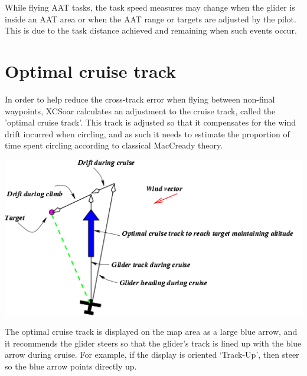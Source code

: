 \documentclass[a4paper,12pt]{refrep}
\begin{document}
While flying AAT tasks, the task speed measures may change when the
glider is inside an AAT area or when the AAT range or targets are
adjusted by the pilot.  This is due to the task distance achieved and
remaining when such events occur.


\section{Optimal cruise track}

In order to help reduce the cross-track error when flying between
non-final waypoints, XCSoar calculates an adjustment to the cruise
track, called the 'optimal cruise track'.  This track is adjusted so
that it compensates for the wind drift incurred when circling, and as
such it needs to estimate the proportion of time spent circling
according to classical MacCready theory.

\begin{center}
\begin{maxipage}
\includegraphics[angle=0,width=\linewidth,keepaspectratio='true']{figures/fig-optcruise.png}
\end{maxipage}
\end{center}

The optimal cruise track is displayed on the map area as a large blue
arrow, and it recommends the glider steers so that the glider's track
is lined up with the blue arrow during cruise.  For example, if the
display is oriented `Track-Up', then steer so the blue arrow points
directly up.
\end{document}
